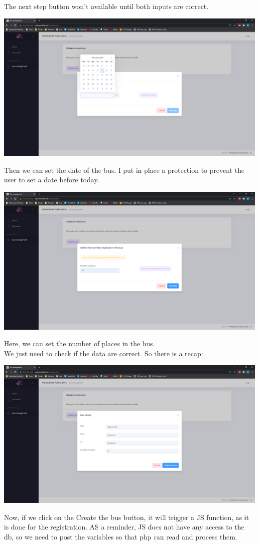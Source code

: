\documentclass[12pt,a4paper,openany]{book}
\begin{document}
\begin{remarque}
	The next step button won't available until both inputs are correct.
\end{remarque}
\begin{center}
	\includegraphics[scale=0.35]{Figs/fig11}
\end{center}
Then we can set the date of the bus. I put in place a protection to prevent the user to set a date before today.
\begin{center}
	\includegraphics[scale=0.35]{Figs/fig12}
\end{center}
Here, we can set the number of places in the bus.\\

\noindent We just need to check if the data are correct. So there is a recap:
\begin{center}
	\includegraphics[scale=0.35]{Figs/fig13}
\end{center}
Now, if we click on the Create the bus button, it will trigger a JS function, as it is done for the registration. AS a reminder, JS does not have any access to the db, so we need to post the variables so that php can read and process them.\\
\end{document}
